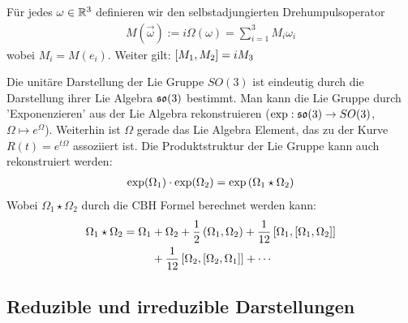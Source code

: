 \vspace{1\baselineskip}

Für jedes $\omega \in \mathbb{R}^3$ definieren wir den selbstadjungierten Drehumpulsoperator
\begin{align*}
    M(\vec{\omega}) := i \Omega(\omega) = \sum_{i=1}^3 M_i \omega_i
\end{align*}
wobei $M_i = M(e_i)$. Weiter gilt: $\left[ M_1,M_2 \right] = i M_3$

\vspace{1\baselineskip}

Die unitäre Darstellung der Lie Gruppe $SO(3)$ ist eindeutig durch die Darstellung
ihrer Lie Algebra $\mathfrak{so}(3)$ bestimmt. Man kann die Lie Gruppe durch 'Exponenzieren'
aus der Lie Algebra rekonstruieren ($\exp : \mathfrak{so}(3) \rightarrow SO(3)$, $\Omega
\mapsto e^\Omega$). Weiterhin ist $\Omega$ gerade das Lie Algebra Element, das
zu der Kurve $R(t) = e^{t \Omega}$ assoziiert ist. Die Produktstruktur der Lie
Gruppe kann auch rekonstruiert werden:
\begin{align*}
    \exp(\Omega_1) \cdot \exp(\Omega_2) = \exp \left( \Omega_1 \star \Omega_2 \right)
\end{align*}
Wobei $\Omega_1 \star \Omega_2$ durch die CBH Formel berechnet werden kann:
\begin{align*}
    \Omega_1 \star \Omega_2 = \Omega_1 &+ \Omega_2 + \frac{1}{2} \left( \Omega_1,\Omega_2 \right)
    + \frac{1}{12} \left[ \Omega_1,\left[ \Omega_1,\Omega_2 \right] \right]
    \\
    &+ \frac{1}{12} \left[ \Omega_2,\left[ \Omega_2,\Omega_1 \right] \right]
    + \dotsb
\end{align*}

\subsection{Reduzible und irreduzible Darstellungen}

